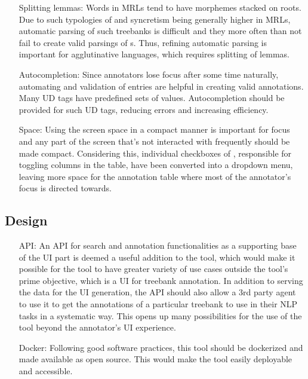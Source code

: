 \begin{itemize}[before=\normalfont, font=\itshape, align=left]
    \item[Splitting lemmas:]
        Words in MRLs tend to have morphemes stacked on roots.
        Due to such typologies of and syncretism being generally higher in MRLs, automatic parsing of such treebanks is difficult and they more often than not fail to create valid parsings of \form s.
        Thus, refining automatic parsing is important for agglutinative languages, which requires splitting of lemmas.

    \item[Autocompletion:]
        Since annotators lose focus after some time naturally, automating and validation of entries are helpful in creating valid annotations.
        Many UD tags have predefined sets of values.
        Autocompletion should be provided for such UD tags, reducing errors and increasing efficiency.

    \item[Space:]
        Using the screen space in a compact manner is important for focus and any part of the screen that's not interacted with frequently should be made compact.
        Considering this, individual checkboxes of \boatvone, responsible for toggling columns in the table, have been converted into a dropdown menu, leaving more space for the annotation table where most of the annotator's focus is directed towards.
\end{itemize}

\subsection{Design}
\begin{itemize}[before=\normalfont, font=\itshape, align=left]
    \item[API:]
        An API for search and annotation functionalities as a supporting base of the UI part is deemed a useful addition to the tool, which would make it possible for the tool to have greater variety of use cases outside the tool's prime objective, which is a UI for treebank annotation.
        In addition to serving the data for the UI generation, the API should also allow a 3rd party agent to use it to get the annotations of a particular treebank to use in their NLP tasks in a systematic way.
        This opens up many possibilities for the use of the tool beyond the annotator's UI experience.

    \item[Docker:]
        Following good software practices, this tool should be dockerized and made available as open source.
        This would make the tool easily deployable and accessible.
\end{itemize}
